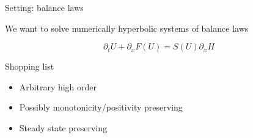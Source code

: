 \begin{frame}[t]{Setting: balance laws}
\MyLogoa

\vspace{0.5cm}

We want to solve numerically  hyperbolic systems of balance laws

\begin{equation}
	\partial_tU+ \partial_x F(U)=  S(U)\partial_xH \nonumber
\end{equation}
 
 
 \vspace{0.5cm}

Shopping list


\begin{itemize}
\item Arbitrary high order
\item  Possibly monotonicity/positivity preserving  
\item Steady state preserving 

\end{itemize}

\vspace{0.2cm}

  
 \end{frame}



